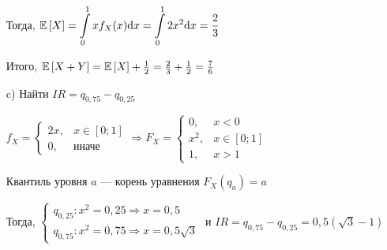 \documentclass{article}
\begin{document}
\begin{enumerate}
    Тогда, $\mathbb{E}\left[X\right]=\displaystyle\int\limits_0^1 xf_{X}(x)\text{d}x=\int\limits_0^1 2x^2\text{d}x=\frac{2}{3}$

    Итого, $\mathbb{E}\left[X+Y\right]=\mathbb{E}\left[X\right]+\frac{1}{2}=\frac{2}{3}+\frac{1}{2}=\frac{7}{6}$
    \item[c)] Найти $IR=q_{0,75}-q_{0,25}$

    $f_{X}=\begin{cases}
        2x,&x\in[0;1]\\
        0,&\text{иначе}
    \end{cases}\Longrightarrow F_{X}=\begin{cases}
        0,&x<0\\
        x^2,&x\in[0;1]\\
        1,&x>1
    \end{cases}$

     Квантиль уровня $a$ — корень уравнения $F_{X}(q_{a})=a$

    Тогда, $\begin{cases}
        q_{0,25}: x^2=0,25\Longrightarrow x=0,5\\
        q_{0,75}: x^2=0,75\Longrightarrow x=0,5\sqrt{3}
    \end{cases}$ и $IR=q_{0,75}-q_{0,25}=0,5(\sqrt{3}-1)$
    
\end{enumerate}


\newpage
\end{document}
